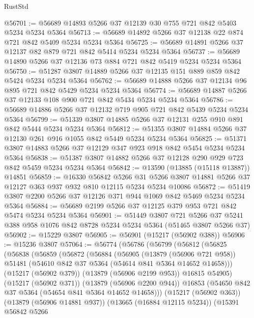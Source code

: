 \begin{lexlean}{RustStd}
\begin{coremodule}
@56701 := @56689 @14893 @5266 @37 @12139 @30 @755 @721 @842 @5403 @5234 @5234 @5364
@56713 := @56689 @14892 @5266 @37 @12138 @22 @874 @721 @842 @5409 @5234 @5234 @5364
@56725 := @56689 @14891 @5266 @37 @12137 @82 @879 @721 @842 @5414 @5234 @5234 @5364
@56737 := @56689 @14890 @5266 @37 @12136 @73 @884 @721 @842 @5419 @5234 @5234 @5364
@56750 := @51287 @3807 @14889 @5266 @37 @12135 @151 @889 @859 @842 @5424 @5234 @5234 @5364
@56762 := @56689 @14888 @5266 @37 @12134 @96 @895 @721 @842 @5429 @5234 @5234 @5364
@56774 := @56689 @14887 @5266 @37 @12133 @108 @900 @721 @842 @5434 @5234 @5234 @5364
@56786 := @56689 @14886 @5266 @37 @12132 @719 @905 @721 @842 @5439 @5234 @5234 @5364
@56799 := @51339 @3807 @14885 @5266 @37 @12131 @255 @910 @891 @842 @5444 @5234 @5234 @5364
@56812 := @51355 @3807 @14884 @5266 @37 @12130 @261 @916 @1055 @842 @5449 @5234 @5234 @5364
@56825 := @51371 @3807 @14883 @5266 @37 @12129 @347 @923 @918 @842 @5454 @5234 @5234 @5364
@56838 := @51387 @3807 @14882 @5266 @37 @12128 @290 @929 @723 @842 @5459 @5234 @5234 @5364
@56842 := @13590 (@13885 (@15118 @13887)) @14851
@56859 := @16330
    @56842
    @5266
    @31
    @5266
    @3807
    @14881
    @5266
    @37
    @12127
    @363
    @937
    @932
    @810
    @12115
    @5234
    @5234
    @10086
@56872 := @51419 @3807 @2200 @5266 @37 @12126 @371 @944 @1069 @842 @5469 @5234 @5234 @5364
@56884 := @56689 @2199 @5266 @37 @12125 @379 @953 @721 @842 @5474 @5234 @5234 @5364
@56901 := @51449
    @3807
    @721
    @5266
    @37
    @5241
    @388
    @958
    @1076
    @842
    @8728
    @5234
    @5234
    @5364
    (@51465 @3807 @5266 @37)
@56902 := @15229 @3807
@56905 := @56901 (@15217 (@56902 @388))
@56906 := @15236 @3807
@57064 := @56774
    (@56786
      (@56799
        (@56812
          (@56825
            (@56838
              (@56859
                (@56872
                  (@56884
                    (@56905
                      (@13879 (@56906 @721 @958))
                      @51481
                      (@54610 @842 @37 @5364 (@54614 @841 @5364 @14652 @14658)))
                    (@15217 (@56902 @379))
                    (@13879 (@56906 @2199 @953))
                    @16815
                    @54905)
                  (@15217 (@56902 @371))
                  (@13879 (@56906 @2200 @944))
                  @16853
                  (@54650 @842 @37 @5364 (@54654 @841 @5364 @14652 @14658)))
                (@15217 (@56902 @363))
                (@13879 (@56906 @14881 @937))
                (@13665 (@16884 @12115 @5234))
                (@15391
                  @56842
                  @5266

\end{coremodule}
\end{lexlean}
